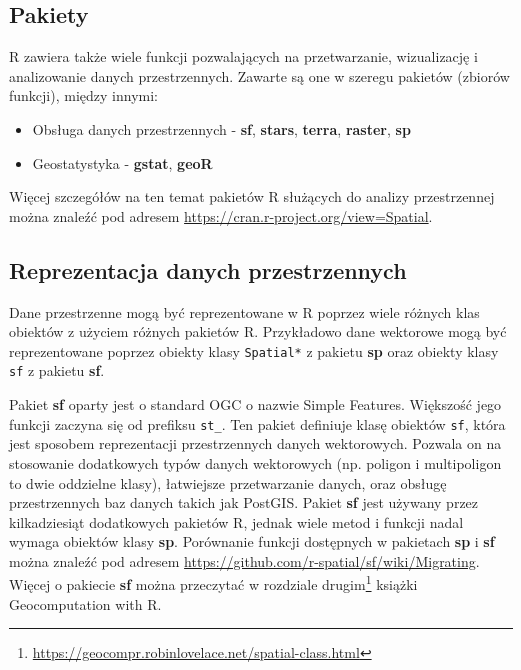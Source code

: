 \documentclass[
  paper=6in:9in,pagesize=pdftex,headinclude=on,footinclude=on,10pt]{scrbook}
\providecommand{\tightlist}{%
  \setlength{\itemsep}{0pt}\setlength{\parskip}{0pt}}
\renewcommand{\href}[2]{#2 (\url{#1})}
\renewcommand{\href}[2]{#2\footnote{\url{#1}}}
\begin{document}
\subsection{Pakiety}\label{pakiety}

R zawiera także wiele funkcji pozwalających na przetwarzanie, wizualizację i analizowanie danych przestrzennych.
Zawarte są one w szeregu pakietów (zbiorów funkcji), między innymi:

\begin{itemize}
\tightlist
\item
  Obsługa danych przestrzennych - \textbf{sf}, \textbf{stars}, \textbf{terra}, \textbf{raster}, \textbf{sp}
\item
  Geostatystyka - \textbf{gstat}, \textbf{geoR}
\end{itemize}

Więcej szczegółów na ten temat pakietów R służących do analizy przestrzennej można znaleźć pod adresem \url{https://cran.r-project.org/view=Spatial}.

\subsection{Reprezentacja danych przestrzennych}\label{reprezentacja-danych-przestrzennych}

Dane przestrzenne mogą być reprezentowane w R poprzez wiele różnych klas obiektów z użyciem różnych pakietów R.
Przykładowo dane wektorowe mogą być reprezentowane poprzez obiekty klasy \texttt{Spatial*} z pakietu \textbf{sp} oraz obiekty klasy \texttt{sf} z pakietu \textbf{sf}.

Pakiet \textbf{sf} oparty jest o standard OGC o nazwie Simple Features.
Większość jego funkcji zaczyna się od prefiksu \texttt{st\_}.
Ten pakiet definiuje klasę obiektów \texttt{sf}, która jest sposobem reprezentacji przestrzennych danych wektorowych.
Pozwala on na stosowanie dodatkowych typów danych wektorowych (np. poligon i multipoligon to dwie oddzielne klasy), łatwiejsze przetwarzanie danych, oraz obsługę przestrzennych baz danych takich jak PostGIS.
Pakiet \textbf{sf} jest używany przez kilkadziesiąt dodatkowych pakietów R, jednak wiele metod i funkcji nadal wymaga obiektów klasy \textbf{sp}.
Porównanie funkcji dostępnych w pakietach \textbf{sp} i \textbf{sf} można znaleźć pod adresem \url{https://github.com/r-spatial/sf/wiki/Migrating}.
Więcej o pakiecie \textbf{sf} można przeczytać w \href{https://geocompr.robinlovelace.net/spatial-class.html}{rozdziale drugim} książki Geocomputation with R.
\end{document}
